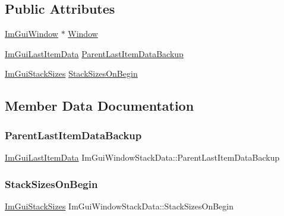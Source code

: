 \subsection*{Public Attributes}
\begin{DoxyCompactItemize}
\item 
\hyperlink{structImGuiWindow}{Im\+Gui\+Window} $\ast$ \hyperlink{structImGuiWindowStackData_afb70ab508cff8113d27a528a7aad4679}{Window}
\item 
\hyperlink{structImGuiLastItemData}{Im\+Gui\+Last\+Item\+Data} \hyperlink{structImGuiWindowStackData_a17e0b0c67ef7780e41d4a0aaea9ab59e}{Parent\+Last\+Item\+Data\+Backup}
\item 
\hyperlink{structImGuiStackSizes}{Im\+Gui\+Stack\+Sizes} \hyperlink{structImGuiWindowStackData_a809355b2963cbe9123f922a96d09c8aa}{Stack\+Sizes\+On\+Begin}
\end{DoxyCompactItemize}


\subsection{Member Data Documentation}
\mbox{\label{structImGuiWindowStackData_a17e0b0c67ef7780e41d4a0aaea9ab59e}} 
\subsubsection{\texorpdfstring{Parent\+Last\+Item\+Data\+Backup}{ParentLastItemDataBackup}}
{\footnotesize\ttfamily \hyperlink{structImGuiLastItemData}{Im\+Gui\+Last\+Item\+Data} Im\+Gui\+Window\+Stack\+Data\+::\+Parent\+Last\+Item\+Data\+Backup}

\mbox{\label{structImGuiWindowStackData_a809355b2963cbe9123f922a96d09c8aa}} 
\subsubsection{\texorpdfstring{Stack\+Sizes\+On\+Begin}{StackSizesOnBegin}}
{\footnotesize\ttfamily \hyperlink{structImGuiStackSizes}{Im\+Gui\+Stack\+Sizes} Im\+Gui\+Window\+Stack\+Data\+::\+Stack\+Sizes\+On\+Begin}

